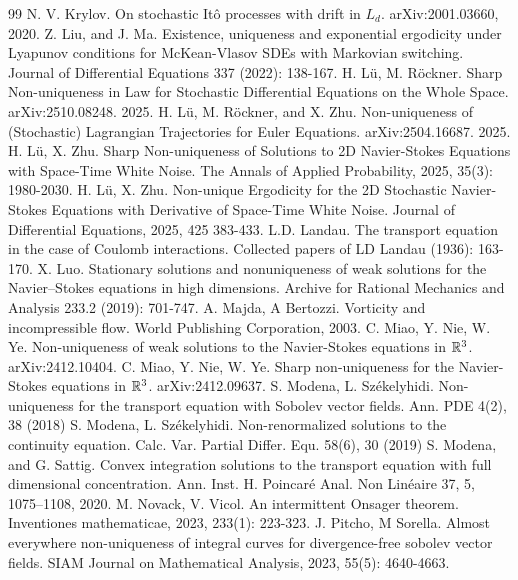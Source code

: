 \documentclass[10pt,a4paper]{amsart}
\numberwithin{equation}{section}
\begin{document}
\begin{thebibliography}{99}
 N. V. Krylov. On stochastic It\^o processes with drift in $L_d$. arXiv:2001.03660, 2020.
 Z. Liu, and J. Ma. Existence, uniqueness and exponential ergodicity under Lyapunov conditions for McKean-Vlasov SDEs with Markovian switching. Journal of Differential Equations 337 (2022): 138-167.
 H. L\"u, M. R\"ockner. Sharp Non-uniqueness in Law for Stochastic Differential Equations on the Whole Space. arXiv:2510.08248. 2025.
 H. L\"u, M. R\"ockner, and X. Zhu. Non-uniqueness of (Stochastic) Lagrangian Trajectories for Euler Equations. arXiv:2504.16687. 2025.
 H. L\"u, X. Zhu. Sharp Non-uniqueness of Solutions to 2D Navier-Stokes Equations with Space-Time White Noise. The Annals of Applied Probability, 2025, 35(3): 1980-2030.
 H. L\"u, X. Zhu. Non-unique Ergodicity for the 2D Stochastic Navier-Stokes Equations with Derivative of Space-Time White Noise. Journal of Differential Equations, 2025, 425 383-433.
 L.D. Landau. The transport equation in the case of Coulomb interactions. Collected papers of LD Landau (1936): 163-170.
 X. Luo. Stationary solutions and nonuniqueness of weak solutions for the Navier–Stokes equations in high dimensions. Archive for Rational Mechanics and Analysis 233.2 (2019): 701-747.
 A. Majda, A Bertozzi. Vorticity and incompressible flow. World Publishing Corporation, 2003.
 C. Miao, Y. Nie, W. Ye. Non-uniqueness of weak solutions to the Navier-Stokes equations in $\mathbb R^3$. arXiv:2412.10404.
 C. Miao, Y. Nie, W. Ye. Sharp non-uniqueness for the Navier-Stokes equations in $\mathbb R^3$. arXiv:2412.09637.
 S. Modena, L. Sz\'ekelyhidi. Non-uniqueness for the transport equation with Sobolev vector fields. Ann. PDE 4(2), 38 (2018)
 S. Modena, L. Sz\'ekelyhidi. Non-renormalized solutions to the continuity equation. Calc. Var. Partial Differ. Equ. 58(6), 30 (2019)
 S. Modena, and G. Sattig. Convex integration solutions to the transport equation with full dimensional concentration. Ann. Inst. H. Poincar\'e Anal. Non Lin\'eaire 37, 5, 1075–1108, 2020.
 M. Novack, V. Vicol. An intermittent Onsager theorem. Inventiones mathematicae, 2023, 233(1): 223-323.
 J. Pitcho, M Sorella. Almost everywhere non-uniqueness of integral curves for divergence-free sobolev vector fields. SIAM Journal on Mathematical Analysis, 2023, 55(5): 4640-4663.

\end{thebibliography}
\end{document}

